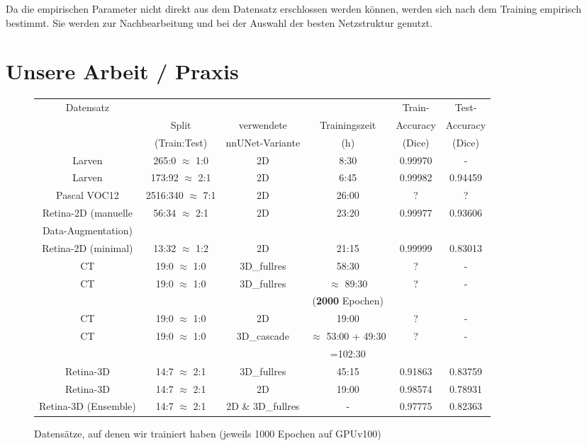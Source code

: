 Da die empirischen Parameter nicht direkt aus dem Datensatz erschlossen werden können, werden sich nach dem Training empirisch bestimmt. Sie werden zur Nachbearbeitung und bei der Auswahl der besten Netzstruktur genutzt. 


\section{Unsere Arbeit / Praxis}
\begin{figure}[H]
\begin{tabular}{|c|c|c|c|c|c|}
\hline 
\multirow{3}{*}{Datensatz} &  &  & & Train-& Test- \\ 
 & Split & verwendete & Trainingszeit & Accuracy& Accuracy \\ 
 & (Train:Test) & nnUNet-Variante & (h) & (Dice)& (Dice)  \\ 
\hline 
Larven & 265:0 $\approx$ 1:0 & 2D & 8:30 & 0.99970 & - \\ 
\hline 
Larven & 173:92 $\approx$ 2:1 & 2D & 6:45 & 0.99982 & 0.94459 \\ 
\hline 
Pascal VOC12 & 2516:340 $\approx$ 7:1 & 2D & 26:00 &  ? & ? \\ 
\hline 
Retina-2D (manuelle & \multirow{2}{*}{56:34 $\approx$ 2:1} & \multirow{2}{*}{2D} & \multirow{2}{*}{23:20} & \multirow{2}{*}{0.99977} &\multirow{2}{*}{0.93606}  \\ 
Data-Augmentation)&  & & & &  \\ 
\hline 
Retina-2D (minimal) & 13:32 $\approx$ 1:2 & 2D & 21:15 & 0.99999 &  0.83013 \\ 
\hline 
CT & 19:0 $\approx$ 1:0 & 3D\_fullres & 58:30  & ? & - \\ 

\hline 
\multirow{2}{*}{CT} & \multirow{2}{*}{19:0 $\approx$ 1:0} & \multirow{2}{*}{3D\_fullres} & $\approx$ 89:30  & \multirow{2}{*}{?} & \multirow{2}{*}{-} \\ 
 &  &  & (\textbf{2000} Epochen) &  &  \\ 
\hline 
CT & 19:0 $\approx$ 1:0 & 2D & 19:00 & ? & - \\ 
\hline 
\multirow{2}{*}{CT} & \multirow{2}{*}{19:0 $\approx$ 1:0} & \multirow{2}{*}{3D\_cascade} & $\approx$ 53:00 + 49:30 & \multirow{2}{*}{?} & \multirow{2}{*}{-} \\ 
 &  &  & =102:30 &  & \\ 
\hline 
Retina-3D & 14:7 $\approx$ 2:1 & 3D\_fullres & 45:15 & 0.91863 & 0.83759 \\ 
\hline 
Retina-3D & 14:7 $\approx$ 2:1  & 2D & 19:00 & 0.98574 & 0.78931 \\ 
\hline 
Retina-3D (Ensemble) & 14:7 $\approx$ 2:1 & 2D \& 3D\_fullres & - & 0.97775 & 0.82363 \\ 
\hline
\end{tabular} 
\caption{Datensätze, auf denen wir trainiert haben (jeweils 1000 Epochen auf GPUv100)}
\end{figure}

